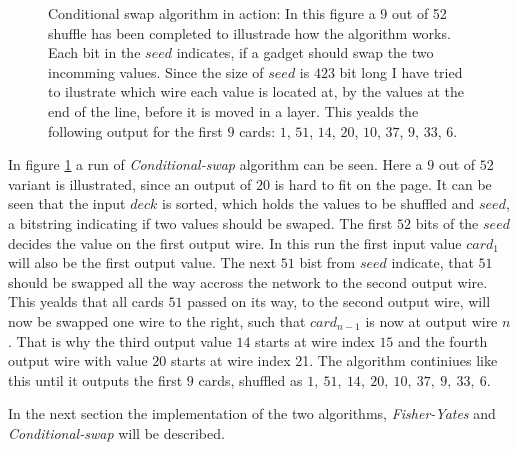\documentclass[twoside,11pt,openright]{report}
\newcommand{\FY}{\textit{Fisher-Yates} }
\newcommand{\CS}{\textit{Conditional-swap} }
\begin{document}
\bigskip

\begin{figure}[t]
\centering
\scalebox{1.5}{}
\caption{Conditional swap algorithm in action: In this figure a 9 out of 52 shuffle has been completed to illustrade how the algorithm works. Each bit in the $seed$ indicates, if a gadget should swap the two incomming values. Since the size of $seed$ is $423$ bit long I have tried to ilustrate which wire each value is located at, by the values at the end of the line, before it is moved in a layer. This yealds the following output for the first $9$ cards: $1$, $51$, $14$, $20$, $10$, $37$, $9$, $33$, $6$.}
\label{fig:con_swap}
\end{figure}

In figure \ref{fig:con_swap} a run of \CS algorithm can be seen. Here a $9$ out of $52$ variant is illustrated, since an output of $20$ is hard to fit on the page. It can be seen that the input $deck$ is sorted, which holds the values to be shuffled and $seed$, a bitstring indicating if two values should be swaped. The first $52$ bits of the $seed$ decides the value on the first output wire. In this run the first input value $card_1$ will also be the first output value. The next $51$ bist from $seed$ indicate, that $51$ should be swapped all the way accross the network to the second output wire. This yealds that all cards $51$ passed on its way, to the second output wire, will now be swapped one wire to the right, such that $card_{n-1}$ is now at output wire $n$. That is why the third output value $14$ starts at wire index $15$ and the fourth output wire with value $20$ starts at wire index 21. The algorithm continiues like this until it outputs the first $9$ cards, shuffled as $1,~51,~14,~20,~10,~37,~9,~33,~6$.

\bigskip

In the next section the implementation of the two algorithms, \FY and \CS will be described.

\end{document}
